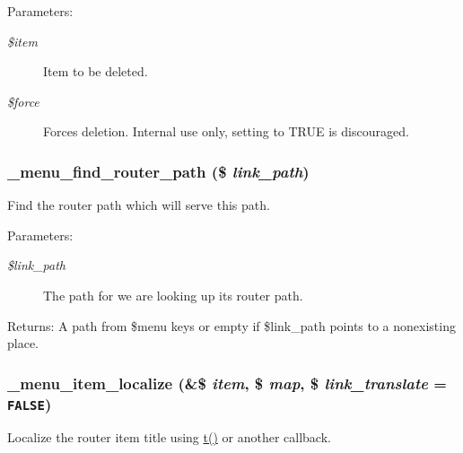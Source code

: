 \begin{Desc}
\item[Parameters:]
\begin{description}
\item[{\em \$item}]Item to be deleted. \item[{\em \$force}]Forces deletion. Internal use only, setting to TRUE is discouraged. \end{description}
\end{Desc}
\hypertarget{group__menu_g0842f6b9cf84f5e5ff159159063a78dd}{
\subsubsection[{\_\-menu\_\-find\_\-router\_\-path}]{\setlength{\rightskip}{0pt plus 5cm}\_\-menu\_\-find\_\-router\_\-path (\$ {\em link\_\-path})}}
\label{group__menu_g0842f6b9cf84f5e5ff159159063a78dd}


Find the router path which will serve this path.

\begin{Desc}
\item[Parameters:]
\begin{description}
\item[{\em \$link\_\-path}]The path for we are looking up its router path. \end{description}
\end{Desc}
\begin{Desc}
\item[Returns:]A path from \$menu keys or empty if \$link\_\-path points to a nonexisting place. \end{Desc}
\hypertarget{group__menu_g3b0c0f37db66372ac4e90afa35b191e9}{
\subsubsection[{\_\-menu\_\-item\_\-localize}]{\setlength{\rightskip}{0pt plus 5cm}\_\-menu\_\-item\_\-localize (\&\$ {\em item}, \/  \$ {\em map}, \/  \$ {\em link\_\-translate} = {\tt FALSE})}}
\label{group__menu_g3b0c0f37db66372ac4e90afa35b191e9}


Localize the router item title using \hyperlink{common_8inc_41d20f0c822bf1f3c26a97981c762665}{t()} or another callback.

